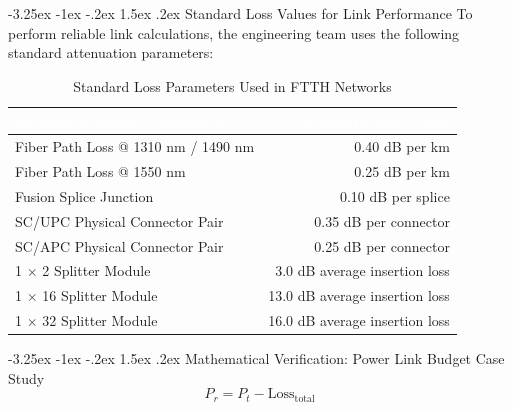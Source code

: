 \documentclass[11pt,a4paper]{report}
\makeatletter
\renewcommand{\section}{\@startsection{section}{1}{\z@}%
  {-3.25ex \@plus -1ex \@minus -.2ex}%
  {1.5ex \@plus.2ex}%
  {\normalfont\Large\bfseries\color{primaryColor}}}
\makeatother
\begin{document}
\section{Standard Loss Values for Link Performance}
To perform reliable link calculations, the engineering team uses the following standard attenuation parameters:
\begin{table}[H]
\centering
\begin{tabularx}{\textwidth}{X r}
\rowcolor{primaryColor}
\textcolor{white}{\textbf{Network Element Component}} & \textcolor{white}{\textbf{Standard Loss Value}} \\
\midrule
Fiber Path Loss @ 1310 nm / 1490 nm & 0.40 dB per km \\
Fiber Path Loss @ 1550 nm & 0.25 dB per km \\
Fusion Splice Junction & 0.10 dB per splice \\
SC/UPC Physical Connector Pair & 0.35 dB per connector \\
SC/APC Physical Connector Pair & 0.25 dB per connector \\
1 $\times$ 2 Splitter Module & 3.0 dB average insertion loss \\
1 $\times$ 16 Splitter Module & 13.0 dB average insertion loss \\
1 $\times$ 32 Splitter Module & 16.0 dB average insertion loss \\
\bottomrule
\end{tabularx}
\caption{Standard Loss Parameters Used in FTTH Networks}
\end{table}
\section{Mathematical Verification: Power Link Budget Case Study}
\begin{equation}P_r = P_t - \text{Loss}_{\text{total}}\end{equation}
\end{document}
